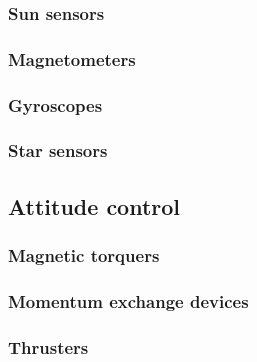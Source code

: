 \documentclass[12pt]{article}
\begin{document}
\subsubsection{Sun sensors}
\subsubsection{Magnetometers}
\subsubsection{Gyroscopes}
\subsubsection{Star sensors}
\subsection{Attitude control}
\subsubsection{Magnetic torquers}
\subsubsection{Momentum exchange devices}
\subsubsection{Thrusters}
\end{document}
